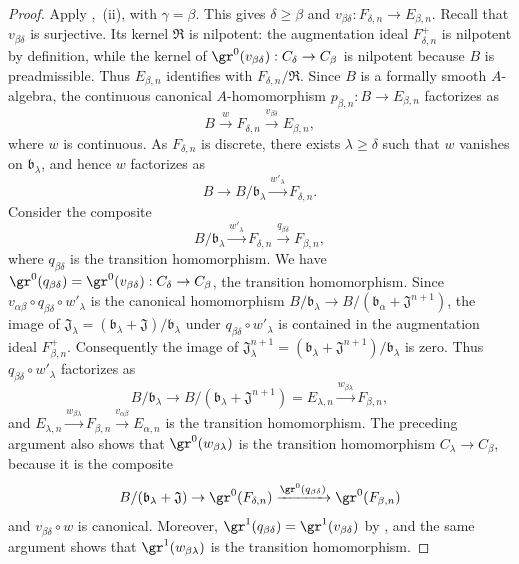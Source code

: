 \begin{proof}
Apply ,~{\rm(ii)}, with $\gamma=\beta$.
This gives $\delta\geq\beta$ and
$v_{\beta\delta}:F_{\delta,n}\to E_{\beta,n}$.
Recall that $v_{\beta\delta}$ is surjective.
Its kernel $\mathfrak{R}$ is nilpotent: the augmentation ideal
$F_{\delta,n}^+$ is nilpotent by definition, while the kernel of
$\gr^0(v_{\beta\delta}):C_\delta\to C_\beta$ is nilpotent because $B$ is
preadmissible.
Thus $E_{\beta,n}$ identifies with $F_{\delta,n}/\mathfrak{R}$.
Since $B$ is a formally smooth $A$-algebra, the continuous canonical
$A$-homomorphism $p_{\beta,n}:B\to E_{\beta,n}$ factorizes as
\[
  B\xrightarrow{w}F_{\delta,n}
  \xrightarrow{v_{\beta\delta}}E_{\beta,n},
\]
where $w$ is continuous.
As $F_{\delta,n}$ is discrete, there exists $\lambda\geq\delta$ such that $w$
vanishes on $\mathfrak{b}_\lambda$, and hence $w$ factorizes as
\[
  B\to B/\mathfrak{b}_\lambda
  \xrightarrow{w'_\lambda}F_{\delta,n}.
\]
Consider the composite
\[
  B/\mathfrak{b}_\lambda\xrightarrow{w'_\lambda}F_{\delta,n}
  \xrightarrow{q_{\beta\delta}}F_{\beta,n},
\]
where $q_{\beta\delta}$ is the transition homomorphism.
We have
$\gr^0(q_{\beta\delta})=\gr^0(v_{\beta\delta}):C_\delta\to C_\beta$,
the transition homomorphism.
Since
$v_{\alpha\beta}\circ q_{\beta\delta}\circ w'_\lambda$
is the canonical homomorphism
$B/\mathfrak{b}_\lambda\to
B/(\mathfrak{b}_\alpha+\mathfrak{J}^{n+1})$,
the image of
$\mathfrak{J}_\lambda=(\mathfrak{b}_\lambda+\mathfrak{J})/
\mathfrak{b}_\lambda$
under $q_{\beta\delta}\circ w'_\lambda$ is contained in the augmentation ideal
$F_{\beta,n}^+$.
Consequently the image of
$\mathfrak{J}_\lambda^{n+1}
=(\mathfrak{b}_\lambda+\mathfrak{J}^{n+1})/\mathfrak{b}_\lambda$
is zero.
Thus $q_{\beta\delta}\circ w'_\lambda$ factorizes as
\[
  B/\mathfrak{b}_\lambda\to
  B/(\mathfrak{b}_\lambda+\mathfrak{J}^{n+1})=E_{\lambda,n}
  \xrightarrow{w_{\beta\lambda}}F_{\beta,n},
\]
and
$E_{\lambda,n}\xrightarrow{w_{\beta\lambda}}F_{\beta,n}
\xrightarrow{v_{\alpha\beta}}E_{\alpha,n}$
is the transition homomorphism.
The preceding argument also shows that $\gr^0(w_{\beta\lambda})$ is the
transition homomorphism $C_\lambda\to C_\beta$, because it is the composite
\[
  B/(\mathfrak{b}_\lambda+\mathfrak{J})
  \to\gr^0(F_{\delta,n})
  \xrightarrow{\gr^0(q_{\beta\delta})}\gr^0(F_{\beta,n})
\]
and $v_{\beta\delta}\circ w$ is canonical.
Moreover,
$\gr^1(q_{\beta\delta})=\gr^1(v_{\beta\delta})$ by
, and the same argument shows that
$\gr^1(w_{\beta\lambda})$ is the transition homomorphism.
\end{proof}

